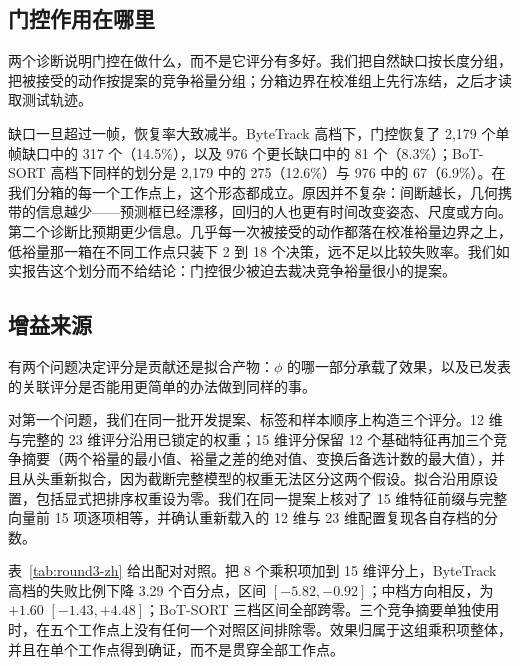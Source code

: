 \subsection{门控作用在哪里}

两个诊断说明门控在做什么，而不是它评分有多好。我们把自然缺口按长度分组，把被接受的动作按提案的竞争裕量分组；分箱边界在校准组上先行冻结，之后才读取测试轨迹。

缺口一旦超过一帧，恢复率大致减半。ByteTrack 高档下，门控恢复了 2,179 个单帧缺口中的 317 个（14.5\%），以及 976 个更长缺口中的 81 个（8.3\%）；BoT-SORT 高档下同样的划分是 2,179 中的 275（12.6\%）与 976 中的 67（6.9\%）。在我们分箱的每一个工作点上，这个形态都成立。原因并不复杂：间断越长，几何携带的信息越少——预测框已经漂移，回归的人也更有时间改变姿态、尺度或方向。第二个诊断比预期更少信息。几乎每一次被接受的动作都落在校准裕量边界之上，低裕量那一箱在不同工作点只装下 2 到 18 个决策，远不足以比较失败率。我们如实报告这个划分而不给结论：门控很少被迫去裁决竞争裕量很小的提案。

\subsection{增益来源}
\label{sec:ablation-zh}

有两个问题决定评分是贡献还是拟合产物：$\phi$ 的哪一部分承载了效果，以及已发表的关联评分是否能用更简单的办法做到同样的事。

对第一个问题，我们在同一批开发提案、标签和样本顺序上构造三个评分。12 维与完整的 23 维评分沿用已锁定的权重；15 维评分保留 12 个基础特征再加三个竞争摘要（两个裕量的最小值、裕量之差的绝对值、变换后备选计数的最大值），并且从头重新拟合，因为截断完整模型的权重无法区分这两个假设。拟合沿用原设置，包括显式把排序权重设为零。我们在同一提案上核对了 15 维特征前缀与完整向量前 15 项逐项相等，并确认重新载入的 12 维与 23 维配置复现各自存档的分数。

表~\ref{tab:round3-zh} 给出配对对照。把 8 个乘积项加到 15 维评分上，ByteTrack 高档的失败比例下降 3.29 个百分点，区间 $[-5.82,-0.92]$；中档方向相反，为 $+1.60$ $[-1.43,+4.48]$；BoT-SORT 三档区间全部跨零。三个竞争摘要单独使用时，在五个工作点上没有任何一个对照区间排除零。效果归属于这组乘积项整体，并且在单个工作点得到确证，而不是贯穿全部工作点。

